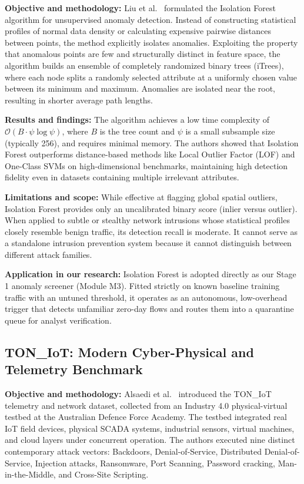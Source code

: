 \noindent\textbf{Objective and methodology:} Liu et al.~\cite{liu2008isolation} formulated the Isolation Forest algorithm for unsupervised anomaly detection. Instead of constructing statistical profiles of normal data density or calculating expensive pairwise distances between points, the method explicitly isolates anomalies. Exploiting the property that anomalous points are few and structurally distinct in feature space, the algorithm builds an ensemble of completely randomized binary trees (iTrees), where each node splits a randomly selected attribute at a uniformly chosen value between its minimum and maximum. Anomalies are isolated near the root, resulting in shorter average path lengths.

\smallskip
\noindent\textbf{Results and findings:} The algorithm achieves a low time complexity of $\mathcal{O}(B \cdot \psi \log \psi)$, where $B$ is the tree count and $\psi$ is a small subsample size (typically 256), and requires minimal memory. The authors showed that Isolation Forest outperforms distance-based methods like Local Outlier Factor (LOF) and One-Class SVMs on high-dimensional benchmarks, maintaining high detection fidelity even in datasets containing multiple irrelevant attributes.

\smallskip
\noindent\textbf{Limitations and scope:} While effective at flagging global spatial outliers, Isolation Forest provides only an uncalibrated binary score (inlier versus outlier). When applied to subtle or stealthy network intrusions whose statistical profiles closely resemble benign traffic, its detection recall is moderate. It cannot serve as a standalone intrusion prevention system because it cannot distinguish between different attack families.

\smallskip
\noindent\textbf{Application in our research:} Isolation Forest is adopted directly as our Stage 1 anomaly screener (Module M3). Fitted strictly on known baseline training traffic with an untuned threshold, it operates as an autonomous, low-overhead trigger that detects unfamiliar zero-day flows and routes them into a quarantine queue for analyst verification.

\subsection{TON\_IoT: Modern Cyber-Physical and Telemetry Benchmark}

\noindent\textbf{Objective and methodology:} Alsaedi et al.~\cite{alshammari2020toniot} introduced the TON\_IoT telemetry and network dataset, collected from an Industry 4.0 physical-virtual testbed at the Australian Defence Force Academy. The testbed integrated real IoT field devices, physical SCADA systems, industrial sensors, virtual machines, and cloud layers under concurrent operation. The authors executed nine distinct contemporary attack vectors: Backdoors, Denial-of-Service, Distributed Denial-of-Service, Injection attacks, Ransomware, Port Scanning, Password cracking, Man-in-the-Middle, and Cross-Site Scripting.

